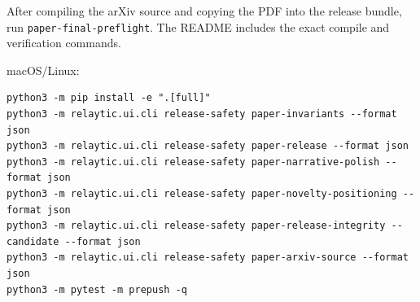 \documentclass[11pt]{article}
\begin{document}
After compiling the arXiv source and copying the PDF into the release bundle, run \nolinkurl{paper-final-preflight}. The README includes the exact compile and verification commands.

macOS/Linux:

\begin{Verbatim}[frame=single,framesep=6pt,fontsize=\footnotesize,breaklines=true,breakanywhere=true]
python3 -m pip install -e ".[full]"
python3 -m relaytic.ui.cli release-safety paper-invariants --format json
python3 -m relaytic.ui.cli release-safety paper-release --format json
python3 -m relaytic.ui.cli release-safety paper-narrative-polish --format json
python3 -m relaytic.ui.cli release-safety paper-novelty-positioning --format json
python3 -m relaytic.ui.cli release-safety paper-release-integrity --candidate --format json
python3 -m relaytic.ui.cli release-safety paper-arxiv-source --format json
python3 -m pytest -m prepush -q
\end{Verbatim}





\end{document}
